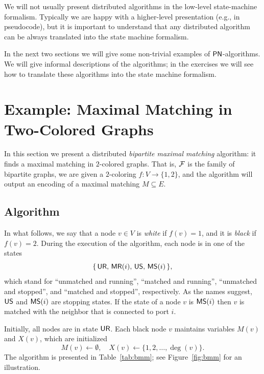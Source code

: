We will not usually present distributed algorithms in the low-level state-machine formalism. Typically we are happy with a higher-level presentation (e.g., in pseudocode), but it is important to understand that any distributed algorithm can be always translated into the state machine formalism.

In the next two sections we will give some non-trivial examples of $\textup{\sffamily PN}$-algorithms. We will give informal descriptions of the algorithms; in the exercises we will see how to translate these algorithms into the state machine formalism.


\section[Example: Bipartite Maximal Matching]{Example: Maximal Matching in Two-Colored Graphs}\label{sec:bmm}

In this section we present a distributed \emph{bipartite maximal matching} algorithm: it finds a maximal matching in $2$-colored graphs. That is, $\mathcal{F}$ is the family of bipartite graphs, we are given a $2$-coloring $f\colon V \to \{1,2\}$, and the algorithm will output an encoding of a maximal matching $M \subseteq E$.

\subsection{Algorithm}

In what follows, we say that a node $v \in V$ is \emph{white} if $f(v) = 1$, and it is \emph{black} if $f(v) = 2$. During the execution of the algorithm, each node is in one of the states
\[
    \{\, 
        \textup{\sffamily UR},\,
        \textup{\sffamily MR}(i),\,
        \textup{\sffamily US},\,
        \textup{\sffamily MS}(i)
     \,\},
\]
which stand for ``unmatched and running'', ``matched and running'', ``unmatched and stopped'', and ``matched and stopped'', respectively. As the names suggest, $\textup{\sffamily US}$ and $\textup{\sffamily MS}(i)$ are stopping states. If the state of a node $v$ is $\textup{\sffamily MS}(i)$ then $v$ is matched with the neighbor that is connected to port $i$.

Initially, all nodes are in state $\textup{\sffamily UR}$. Each black node $v$ maintains variables $M(v)$ and $X(v)$, which are initialized
\[
    M(v) \gets \emptyset, \quad X(v) \gets \{ 1,2, \dotsc, \deg(v) \}.
\]
The algorithm is presented in Table~\ref{tab:bmm}; see Figure~\ref{fig:bmm} for an illustration.

